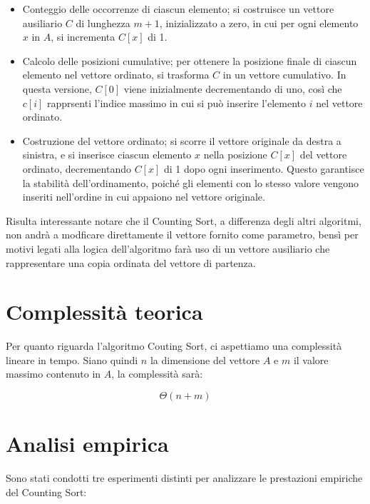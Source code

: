 \documentclass[a4paper, 12pt, oneside]{book}
\begin{document}
\begin{itemize}
    \item Conteggio delle occorrenze di ciascun elemento; si costruisce un vettore ausiliario \(C\) di lunghezza \(m+1\), inizializzato a zero, in cui per ogni elemento \(x\) in \(A\), si incrementa \(C[x]\) di 1.
    \item Calcolo delle posizioni cumulative; per ottenere la posizione finale di ciascun elemento nel vettore ordinato, si trasforma \(C\) in un vettore cumulativo. In questa versione, \(C[0]\) viene inizialmente decrementando di uno, così che \(c[i]\) rapprsenti l'indice massimo in cui si può inserire l'elemento \(i\) nel vettore ordinato.
    \item Costruzione del vettore ordinato; si scorre il vettore originale da destra a sinistra, e si inserisce ciascun elemento \(x\) nella posizione \(C[x]\) del vettore ordinato, decrementando \(C[x]\) di 1 dopo ogni inserimento. Questo garantisce la stabilità dell'ordinamento, poiché gli elementi con lo stesso valore vengono inseriti nell'ordine in cui appaiono nel vettore originale.
\end{itemize}

\noindent Risulta interessante notare che il Counting Sort, a differenza degli altri algoritmi, non andrà a modficare direttamente il vettore fornito come parametro, bensì per motivi legati alla logica dell'algoritmo farà uso di un vettore ausiliario che rappresentare una copia ordinata del vettore di partenza.

\section{Complessità teorica}

Per quanto riguarda l'algoritmo Couting Sort, ci aspettiamo una complessità lineare in tempo.
Siano quindi \(n\) la dimensione del vettore \(A\) e \(m\) il valore massimo contenuto in \(A\), la complessità sarà:

\begin{equation*}
    \Theta(n+m) 
\end{equation*}

\section{Analisi empirica}

Sono stati condotti tre esperimenti distinti per analizzare le prestazioni empiriche del Counting Sort:
\end{document}
